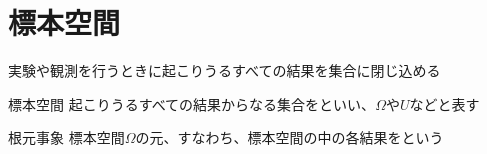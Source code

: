 \documentclass[../../../topic_probability-statistics]{subfiles}
\begin{document}
\sectionline
\section{標本空間}

実験や観測を行うときに起こりうるすべての結果を集合に閉じ込める

\begin{definition}{標本空間}
  起こりうるすべての結果からなる集合をといい、$\Omega$や$U$などと表す
\end{definition}

\begin{definition}{根元事象}
  標本空間$\Omega$の元、すなわち、標本空間の中の各結果をという
\end{definition}
\end{document}
